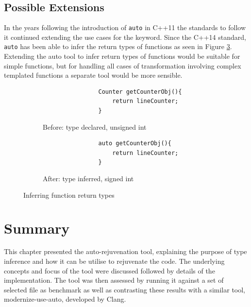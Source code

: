 \documentclass[bsc,frontabs,singlespacing,parskip,deptreport]{infthesis}
\begin{document}

\subsection{Possible Extensions}
In the years following the introduction of \texttt{auto} in C++11 the standards to follow it continued extending the use cases for the keyword. Since the C++14 standard, \texttt{auto} has been able to infer the return types of functions as seen in Figure \ref{fig:funct-ret-inferred}. Extending the auto tool to infer return types of functions would be suitable for simple functions, but for handling all cases of transformation involving complex templated functions a separate tool would be more sensible.

\begin{figure}[!h]
    \centering
    \begin{subfigure}[h]{\textwidth}
        \centering
        \begin{verbatim}
                Counter getCounterObj(){
                    return lineCounter;
                }
        \end{verbatim}
        \caption{Before: type declared, unsigned int}
        \label{fig:funct-ret-inferred-before}
        \vspace{0.40cm}
    \end{subfigure}
    \begin{subfigure}[h]{\textwidth}
        \centering
        \begin{verbatim}
                auto getCounterObj(){
                    return lineCounter;
                }
        \end{verbatim}
        \caption{After: type inferred, signed int}
        \label{fig:funct-ret-inferred-after}
    \end{subfigure}
    \caption{Inferring function return types}
    \label{fig:funct-ret-inferred}
\end{figure}


\section{Summary}%
This chapter presented the auto-rejuvenation tool, explaining the purpose of type inference and how it can be utilise to rejuvenate the code. The underlying concepts and focus of the tool were discussed followed by details of the implementation. The tool was then assessed by running it against a set of selected file as benchmark as well as contrasting these results with a similar tool, modernize-use-auto, developed by Clang. 
\end{document}
